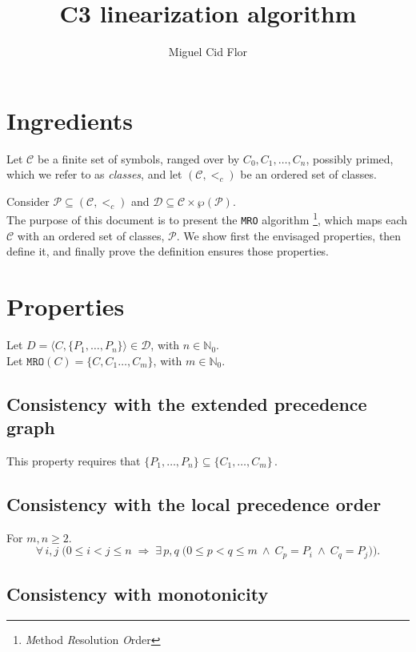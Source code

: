 \documentclass{article}
\title{C3 linearization algorithm}
\author{Miguel Cid Flor}
\newcommand*{\CC}{\ensuremath{\mathcal{C}}\xspace}
\newcommand*{\DD}{\ensuremath{\mathcal{D}}\xspace}
\newcommand*{\ordCC}{\ensuremath{(\mathcal{C}, <_c)}\xspace}
\newcommand*{\mro}{\texttt{MRO}}
\newcommand*{\natz}{\ensuremath{\mathbb{N}_0}}
\begin{document}
\maketitle

\section*{Ingredients}

Let \CC be a finite set of symbols, ranged over by \( C_0, C_1, \ldots, C_n \), possibly primed, which we refer to as \emph{classes}, and let \ordCC be an ordered set of classes. %

Consider $\mathcal P \subseteq \ordCC$ and $\DD \subseteq \CC \times \wp{(\mathcal P)}$.\\

The purpose of this document is to present the \texttt{MRO} algorithm%
\footnote{\emph{M}ethod \emph{R}esolution \emph{O}rder},
which maps each $\CC$ with an ordered set of classes, $\mathcal P$. We show first the envisaged properties, then define it, and finally prove the definition ensures those properties.


\section*{Properties}

Let $D = \langle C, \{P_1, \dots, P_n\} \rangle \in \DD$, with $n\in\natz$.\\
Let $\mro(C) = \{C,C_1 \dots, C_m\}$, with $m \in \natz$.\\
\subsection*{Consistency with the extended precedence graph} 
This property requires that
\(
\{P_1, \dots, P_n\} \subseteq \{C_1, \dots, C_m\}\,.
\)


\subsection*{Consistency with the local precedence order}
For $m,n \geq 2$.\\
\[
\forall\,i,j\;\bigl(0\le i<j\le n
\;\Longrightarrow\;
\exists\,p,q\;\bigl(0\le p<q\le m \ \wedge \ C_p=P_i \ \wedge \ C_q=P_j\bigr)\bigr).
\]

\subsection*{Consistency with monotonicity}
\end{document}
